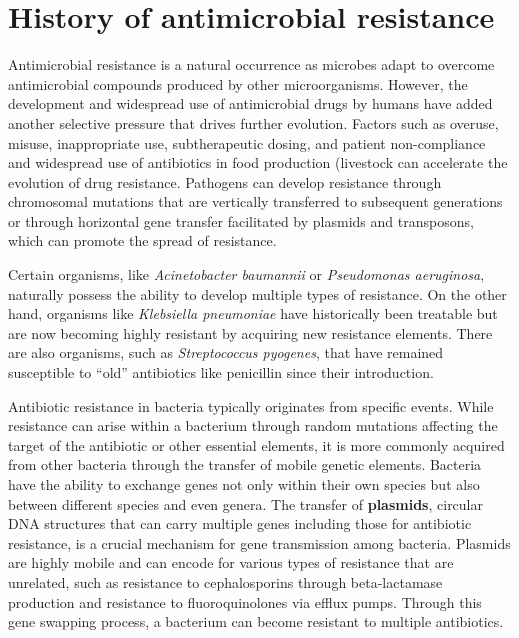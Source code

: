 \documentclass[
  letterpaper,
  DIV=11,
  numbers=noendperiod]{scrreprt}
\begin{document}
\hypertarget{history-of-antimicrobial-resistance}{%
\section{History of antimicrobial
resistance}\label{history-of-antimicrobial-resistance}}

Antimicrobial resistance is a natural occurrence as microbes adapt to
overcome antimicrobial compounds produced by other microorganisms.
However, the development and widespread use of antimicrobial drugs by
humans have added another selective pressure that drives further
evolution. Factors such as overuse, misuse, inappropriate use,
subtherapeutic dosing, and patient non-compliance and widespread use of
antibiotics in food production (livestock can accelerate the evolution
of drug resistance. Pathogens can develop resistance through chromosomal
mutations that are vertically transferred to subsequent generations or
through horizontal gene transfer facilitated by plasmids and
transposons, which can promote the spread of resistance.

Certain organisms, like \emph{Acinetobacter baumannii} or
\emph{Pseudomonas aeruginosa}, naturally possess the ability to develop
multiple types of resistance. On the other hand, organisms like
\emph{Klebsiella pneumoniae} have historically been treatable but are
now becoming highly resistant by acquiring new resistance elements.
There are also organisms, such as \emph{Streptococcus pyogenes}, that
have remained susceptible to ``old'' antibiotics like penicillin since
their introduction.

Antibiotic resistance in bacteria typically originates from specific
events. While resistance can arise within a bacterium through random
mutations affecting the target of the antibiotic or other essential
elements, it is more commonly acquired from other bacteria through the
transfer of mobile genetic elements. Bacteria have the ability to
exchange genes not only within their own species but also between
different species and even genera. The transfer of \textbf{plasmids},
circular DNA structures that can carry multiple genes including those
for antibiotic resistance, is a crucial mechanism for gene transmission
among bacteria. Plasmids are highly mobile and can encode for various
types of resistance that are unrelated, such as resistance to
cephalosporins through beta-lactamase production and resistance to
fluoroquinolones via efflux pumps. Through this gene swapping process, a
bacterium can become resistant to multiple antibiotics.
\end{document}
